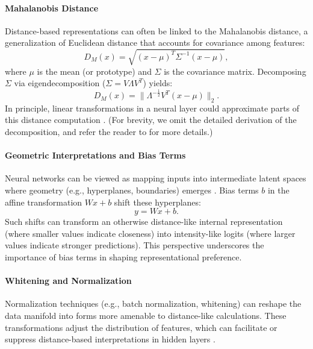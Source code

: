 \documentclass{article}
\begin{document}
\paragraph{Mahalanobis Distance}
Distance-based representations can often be linked to the Mahalanobis distance, a generalization of Euclidean distance that accounts for covariance among features:
\begin{equation}
    D_M(x) = \sqrt{(x - \mu)^T \Sigma^{-1} (x - \mu)},
    \label{eq:mahalanobis-1}
\end{equation}
where $\mu$ is the mean (or prototype) and $\Sigma$ is the covariance matrix. 
Decomposing $\Sigma$ via eigendecomposition ($\Sigma = V \Lambda V^T$) yields:
\begin{equation}
    D_M(x) = \|\Lambda^{-\frac{1}{2}} V^T (x - \mu)\|_2.
    \label{eq:mahalanobis-2}
\end{equation}
In principle, linear transformations in a neural layer could approximate parts of this distance computation \cite{bishop2006pattern}. (For brevity, we omit the detailed derivation of the decomposition, and refer the reader to \cite{bishop2006pattern} for more details.)

\paragraph{Geometric Interpretations and Bias Terms}
Neural networks can be viewed as mapping inputs into intermediate latent spaces where geometry (e.g., hyperplanes, boundaries) emerges \cite{jolliffe2002pca}. Bias terms $b$ in the affine transformation $Wx + b$ shift these hyperplanes:
\begin{equation}
    y = Wx + b.
\end{equation}
Such shifts can transform an otherwise distance-like internal representation (where smaller values indicate closeness) into intensity-like logits (where larger values indicate stronger predictions). This perspective underscores the importance of bias terms in shaping representational preference.

\paragraph{Whitening and Normalization}
Normalization techniques (e.g., batch normalization, whitening) can reshape the data manifold into forms more amenable to distance-like calculations. These transformations adjust the distribution of features, which can facilitate or suppress distance-based interpretations in hidden layers \cite{bishop2006pattern}.
\end{document}
